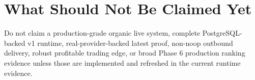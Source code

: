 \documentclass{article}
\begin{document}
\section*{What Should Not Be Claimed Yet}
Do not claim a production-grade organic live system, complete PostgreSQL-backed v1 runtime, real-provider-backed latest proof, non-noop outbound delivery, robust profitable trading edge, or broad Phase 6 production ranking evidence unless those are implemented and refreshed in the current runtime evidence.
\end{document}
